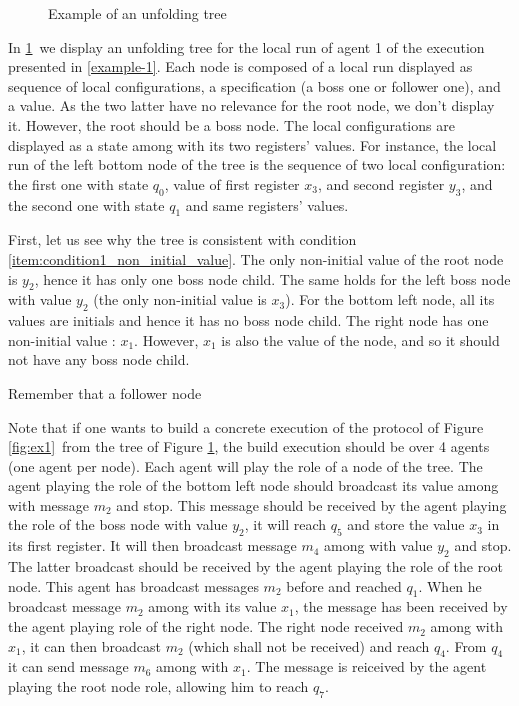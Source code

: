 \begin{figure}
	\begin{center}
		
	\end{center}
	\caption{Example of an unfolding tree}\label{fig-ex-unfolding-tree}
\end{figure}

\begin{example}
	In \cref{fig-ex-unfolding-tree}~we display an unfolding tree for the local run of agent 1 of the execution presented in \cref{example-1}. Each node is composed of a local run displayed as sequence of local configurations, a specification (a boss one or follower one), and a value. As the two latter have no relevance for the root node, we don't display it. However, the root should be a boss node. The local configurations are displayed as a state among with its two registers' values. For instance, the local run of the left bottom node of the tree is the sequence of two local configuration: the first one with state $q_0$, value of first register $x_3$, and second register $y_3$, and the second one with state $q_1$ and same registers' values.
	
	
	
	First, let us see why the tree is consistent with condition \ref{item:condition1_non_initial_value}. The only non-initial value of the root node is $y_2$, hence it has only one boss node child. The same holds for the left boss node with value $y_2$ (the only non-initial value is $x_3$). For the bottom left node, all its values are initials and hence it has no boss node child. The right node has one non-initial value : $x_1$. However, $x_1$ is also the value of the node, and so it should not have any boss node child. 
	
	Remember that a follower node 
	
	
	
	Note that if one wants to build a concrete execution of the protocol of Figure \ref{fig:ex1}~from the tree of Figure \ref{fig-ex-unfolding-tree}, the build execution should be over 4 agents (one agent per node). Each agent will play the role of a node of the tree. The agent playing the role of the bottom left node should broadcast its value among with message $m_2$ and stop. This message should be received by the agent playing the role of the boss node with value $y_2$, it will reach $q_5$ and store the value $x_3$ in its first register. It will then broadcast message $m_4$ among with value $y_2$ and stop. The latter broadcast should be received by the agent playing the role of the root node. This agent has broadcast messages $m_2$ before and reached $q_1$. When he broadcast message $m_2$ among with its value $x_1$, the message has been received by the agent playing role of the right node.
	The right node received $m_2$ among with $x_1$, it can then broadcast $m_2$ (which shall not be received) and reach $q_4$. From $q_4$ it can send message $m_6$ among with $x_1$. The message is reiceived by the agent playing the root node role, allowing him to reach $q_7$.
	


\end{example}
